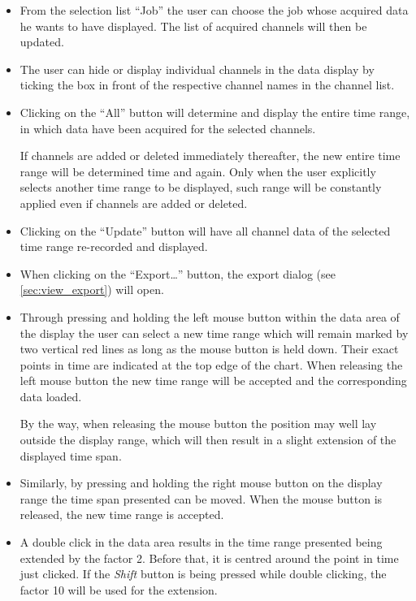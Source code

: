 \documentclass[a4paper,12pt,BCOR6mm,bibtotoc,idxtotoc]{scrbook}
\begin{document}
\begin{itemize}

\item From the selection list ``Job'' the user can choose the job whose
acquired data he wants to have displayed. The list of acquired channels will
then be updated.

\item The user can hide or display individual channels in the data display by
ticking the box in front of the respective channel names in the channel list.

\item Clicking on the ``All'' button will determine and display the entire
time range, in which data have been acquired for the selected channels.

If channels are added or deleted immediately thereafter, the new entire time
range will be determined time and again. Only when the user explicitly selects
another time range to be displayed, such range will be constantly applied even
if channels are added or deleted.

\item Clicking on the ``Update'' button will have all channel data of the
selected time range re-recorded and displayed.

\item When clicking on the ``Export\ldots'' button, the export dialog (see
\autoref{sec:view_export}) will open.

\item Through pressing and holding the left mouse button within the data area
of the display the user can select a new time range which will remain marked
by two vertical red lines as long as the mouse button is held down. Their
exact points in time are indicated at the top edge of the chart. When
releasing the left mouse button the new time range will be accepted and the
corresponding data loaded.

By the way, when releasing the mouse button the position may well lay outside
the display range, which will then result in a slight extension of the
displayed time span.

\item Similarly, by pressing and holding the right mouse button on the display
range the time span presented can be moved. When the mouse button is released,
the new time range is accepted.

\item A double click in the data area results in the time range presented
being extended by the factor 2. Before that, it is centred around the point in
time just clicked. If the \textit{Shift} button is being pressed while double
clicking, the factor 10 will be used for the extension.


\end{itemize}
\end{document}
